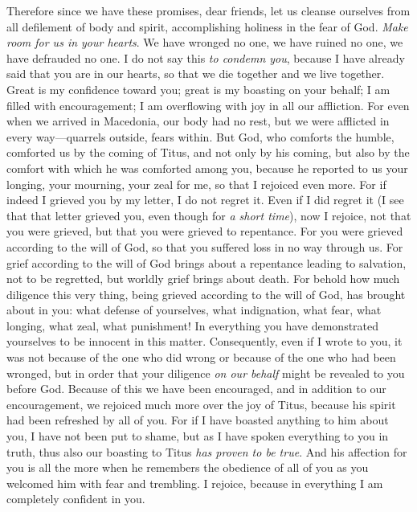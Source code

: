 \begin{biblechapter} %
 Therefore since we have these promises, dear friends, let us cleanse ourselves from all defilement of body and spirit, accomplishing holiness in the fear of God.
\verse \textit{Make room for us in your hearts}. We have wronged no one, we have ruined no one, we have defrauded no one.
\verse I do not say this \textit{to condemn you}, because I have already said that you are in our hearts, so that we die together and we live together.
\verse Great is my confidence toward you; great is my boasting on your behalf; I am filled with encouragement; I am overflowing with joy in all our affliction.
\verse For even when we arrived in Macedonia, our body had no rest, but we were afflicted in every way—quarrels outside, fears within.
\verse But God, who comforts the humble, comforted us by the coming of Titus,
\verse and not only by his coming, but also by the comfort with which he was comforted among you, because he reported to us your longing, your mourning, your zeal for me, so that I rejoiced even more.
\verse For if indeed I grieved you by my letter, I do not regret it. Even if I did regret it (I see that that letter grieved you, even though for \textit{a short time}),
\verse now I rejoice, not that you were grieved, but that you were grieved to repentance. For you were grieved according to the will of God, so that you suffered loss in no way through us.
\verse For grief according to the will of God brings about a repentance leading to salvation, not to be regretted, but worldly grief brings about death.
\verse For behold how much diligence this very thing, being grieved according to the will of God, has brought about in you: what defense of yourselves, what indignation, what fear, what longing, what zeal, what punishment! In everything you have demonstrated yourselves to be innocent in this matter.
\verse Consequently, even if I wrote to you, it was not because of the one who did wrong or because of the one who had been wronged, but in order that your diligence \textit{on our behalf} might be revealed to you before God.
\verse Because of this we have been encouraged, and in addition to our encouragement, we rejoiced much more over the joy of Titus, because his spirit had been refreshed by all of you.
\verse For if I have boasted anything to him about you, I have not been put to shame, but as I have spoken everything to you in truth, thus also our boasting to Titus \textit{has proven to be true}.
\verse And his affection for you is all the more when he remembers the obedience of all of you as you welcomed him with fear and trembling.
\verse I rejoice, because in everything I am completely confident in you.
\end{biblechapter}

